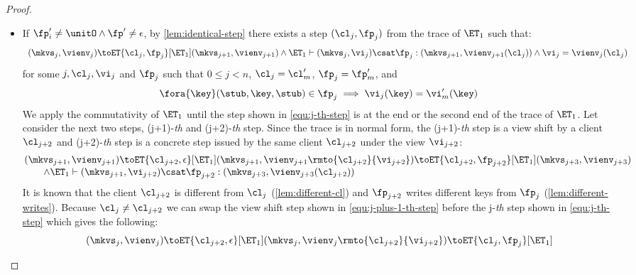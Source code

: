 \begin{proof}
\begin{itemize}
\begin{itemize}
    \item If \( \fp'_i \neq \unitO  \land \fp' \neq \epsilon \), by \cref{lem:identical-step} there exists a step \( (\cl_j, \fp_j) \) from the trace of \( \ET_1 \) such that:
\begin{equation}
    \label{equ:j-th-step}
    \begin{array}{l}
    (\mkvs_{j}, \vienv_{j}) \toET{\cl_{j}, \fp_{j}}[\ET_1] (\mkvs_{j + 1}, \vienv_{j + 1}) 
    \land \ET_1 \vdash (\mkvs_{j}, \vi_j) \csat \fp_j : (\mkvs_{j+1},\vienv_{j + 1}(\cl_{j}) ) \land \vi_j = \vienv_{j}(\cl_j)
\end{array}
\end{equation}
for some \( j, \cl_j, \vi_j\) and \( \fp_j \) such that \( 0 \leq  j < n \), \( \cl_j = \cl'_{m}\), \( \fp_j = \fp'_{m}\), and
\[ 
    \fora{\key} (\stub, \key, \stub ) \in \fp_j \implies \vi_j(\key) = \vi'_{m}(\key)
\]
We apply the commutativity of \( \ET_1 \) until the step shown in \cref{equ:j-th-step} is at the end or the second end of the trace of \( \ET_1 \).
Let consider the next two steps, (j+1)-\emph{th} and (j+2)-\emph{th} step.
Since the trace is in normal form, the (j+1)-\emph{th} step is a view shift by a client \( \cl_{j+2} \) and (j+2)-\emph{th} step is a concrete step issued by the same client \( \cl_{j+2} \) under the view \( \vi_{j+2} \):
\begin{equation}
    \label{equ:j-plus-1-th-step}
    \begin{array}{@{}l@{}}
        (\mkvs_{j+1}, \vienv_{j+1}) \toET{\cl_{j+2}, \epsilon}[\ET_1]
        (\mkvs_{j+1}, \vienv_{j+1}\rmto{\cl_{j+2}}{\vi_{j+2}}) \toET{\cl_{j+2}, \fp_{j+2}}[\ET_1] (\mkvs_{j+3}, \vienv_{j+3}) \\
        \qquad \land \ET_1 \vdash (\mkvs_{j+1},\vi_{j+2}) \csat \fp_{j+2} : (\mkvs_{j+3},\vienv_{j+3}(\cl_{j+2}) )
    \end{array}
\end{equation}
It is known that the client  \( \cl_{j+2} \) is different from \( \cl_j \) (\cref{lem:different-cl}) and \( \fp_{j+2} \) writes different keys from \( \fp_j\) (\cref{lem:different-writes}). 
Because \( \cl_j \neq \cl_{j+2} \) we can swap the view shift step shown in \cref{equ:j-plus-1-th-step} before the j-\emph{th} step shown in \cref{equ:j-th-step} which gives the following:
\begin{equation}
    \label{equ:swap-the-view-shift-et1}
    \begin{array}{@{}l@{}}
    (\mkvs_{j}, \vienv_{j}) \toET{\cl_{j+2}, \epsilon}[\ET_1] (\mkvs_{j}, \vienv_{j}\rmto{\cl_{j+2}}{\vi_{j+2}}) \toET{\cl_{j}, \fp_{j}}[\ET_1] \\

\end{array}
\end{equation}
\end{itemize}
\end{itemize}
\end{proof}
